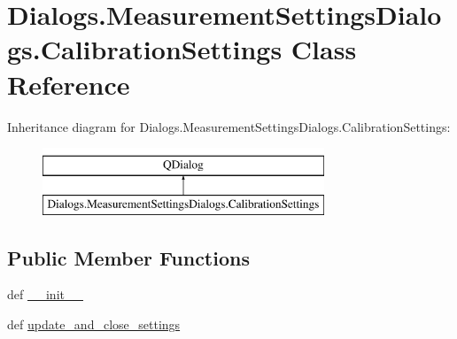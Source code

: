 \hypertarget{classDialogs_1_1MeasurementSettingsDialogs_1_1CalibrationSettings}{\section{Dialogs.\-Measurement\-Settings\-Dialogs.\-Calibration\-Settings Class Reference}
\label{classDialogs_1_1MeasurementSettingsDialogs_1_1CalibrationSettings}
}
Inheritance diagram for Dialogs.\-Measurement\-Settings\-Dialogs.\-Calibration\-Settings\-:\begin{figure}[H]
\begin{center}
\leavevmode
\includegraphics[height=2.000000cm]{classDialogs_1_1MeasurementSettingsDialogs_1_1CalibrationSettings}
\end{center}
\end{figure}
\subsection*{Public Member Functions}
\begin{DoxyCompactItemize}
\item 
def \hyperlink{classDialogs_1_1MeasurementSettingsDialogs_1_1CalibrationSettings_a8feb6db7e370d5493e59b6033455d0e1}{\-\_\-\-\_\-init\-\_\-\-\_\-}
\item 
def \hyperlink{classDialogs_1_1MeasurementSettingsDialogs_1_1CalibrationSettings_a97ca16f8cc439defb940360b5ce2298c}{update\-\_\-and\-\_\-close\-\_\-settings}
\end{DoxyCompactItemize}
